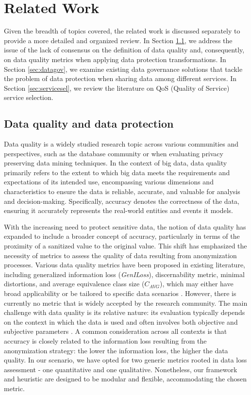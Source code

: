 \section{Related Work}\label{sec:related}

Given the breadth of topics covered, the related work is discussed separately to provide a more detailed and organized review. In Section  \ref{sec:dataquality}, we address the issue of the lack of consensus on the definition of data quality and, consequently, on data quality metrics when applying data protection transformations. In Section \ref{sec:datagov}, we examine existing data governance solutions that tackle the problem of data protection when sharing data among different services. In Section \ref{sec:servicesel}, we review the literature on QoS (Quality of Service) service selection.

\subsection{Data quality and data protection}\label{sec:dataquality}

Data quality is a widely studied research topic across various communities and perspectives, such as the database community or when evaluating privacy preserving data mining techniques. In the context of big data, data quality primarily refers to the extent to which big data meets the requirements and expectations of its intended use, encompassing various dimensions and characteristics to ensure the data is reliable, accurate, and valuable for analysis and decision-making. Specifically, accuracy denotes the correctness of the data, ensuring it accurately represents the real-world entities and events it models.

With the increasing need to protect sensitive data, the notion of data quality has expanded to include a broader concept of accuracy, particularly in terms of the proximity of a sanitized value to the original value.
This shift has emphasized the necessity of metrics to assess the quality of data resulting from anonymization processes. Various data quality metrics have been proposed in existing literature, including generalized information loss (\textit{GenILoss}), discernability metric, minimal distortions, and average equivalence class size ($C_{AVG}$), which may either have broad applicability or be tailored to specific data scenarios \cite{Majeed2021AnonymizationTF,bookMetrics,reviewMetrics}. However, there is currently no metric that is widely accepted by the research community. The main challenge with data quality is its relative nature: its evaluation typically depends on the context in which the data is used and often involves both objective and subjective parameters \cite{dataAccuracy,dataQuality}.
%
A common consideration across all contexts is that accuracy is closely related to the information loss resulting from the anonymization strategy: the lower the information loss, the higher the data quality. In our scenario, we have opted for two generic metrics rooted in data loss assessment - one quantitative and one qualitative. Nonetheless, our framework and heuristic are designed to be modular and flexible, accommodating the chosen metric.


